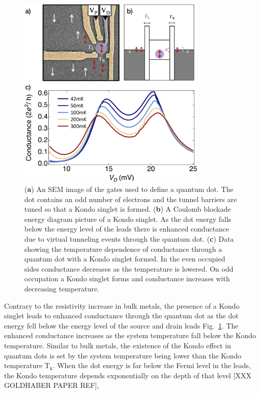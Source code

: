  
\begin{figure}[!hbt]
  \begin{center}
    \includegraphics[width=0.8\textwidth]{figures/ch2/crop_PosterFiguresMaster.008.png}
    \caption[Kondo effect in a quantum dot in the Kondo regime]{\label{fig:ch2/kondo_regime_conductance} 
    (\textbf{a}) An SEM image of the gates used to define a quantum dot. The dot contains an odd number of electrons and the tunnel barriers are tuned so that a Kondo singlet is formed. (\textbf{b}) A Coulomb blockade energy diagram picture of a Kondo singlet. As the dot energy falls below the energy level of the leads there is enhanced conductance due to virtual tunneling events through the quantum dot. (\textbf{c}) Data showing the temperature dependence of conductance through a quantum dot with a Kondo singlet formed. In the even occupied sides conductance decreases as the temperature is lowered. On odd occupation a Kondo singlet forms and conductance increases with decreasing temperature.}
  \end{center}
\end{figure}


 Contrary to the resistivity increase in bulk metals, the presence of a Kondo singlet leads to enhanced conductance through the quantum dot as the dot energy fell below the energy level of the source and drain leads Fig.~\ref{fig:ch2/kondo_regime_conductance}. The enhanced conductance increases as the system temperature fall below the Kondo temperature. Similar to bulk metals, the existence of the Kondo effect in quantum dots is set by the system temperature being lower than the Kondo temperature $\mathrm{T_k}$. When the dot energy is far below the Fermi level in the leads, the Kondo temperature depends exponentially on the depth of that level [XXX GOLDHABER PAPER REF], 

